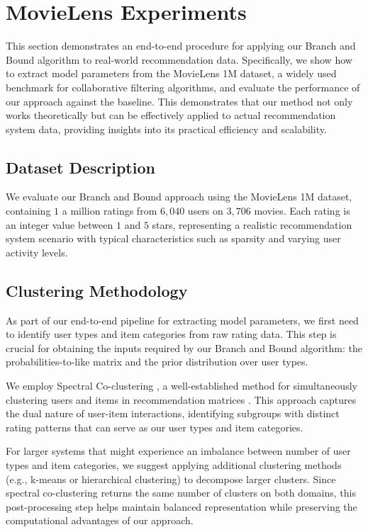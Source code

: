 \section{MovieLens Experiments}\label{sec:movielens}

This section demonstrates an end-to-end procedure for applying our Branch and Bound algorithm to real-world recommendation data. Specifically, we show how to extract model parameters from the MovieLens 1M dataset, a widely used benchmark for collaborative filtering algorithms, and evaluate the performance of our approach against the baseline. This demonstrates that our method not only works theoretically but can be effectively applied to actual recommendation system data, providing insights into its practical efficiency and scalability.

\subsection{Dataset Description}
We evaluate our Branch and Bound approach using the MovieLens 1M dataset, containing $1$ a million ratings from $6,040$ users on $3,706$ movies. Each rating is an integer value between $1$ and $5$ stars, representing a realistic recommendation system scenario with typical characteristics such as sparsity and varying user activity levels.

\subsection{Clustering Methodology}

As part of our end-to-end pipeline for extracting model parameters, we first need to identify user types and item categories from raw rating data. This step is crucial for obtaining the inputs required by our Branch and Bound algorithm: the probabilities-to-like matrix and the prior distribution over user types.

We employ Spectral Co-clustering \citep{coclustering}, a well-established method for simultaneously clustering users and items in recommendation matrices \citep{george2005scalable}. This approach captures the dual nature of user-item interactions, identifying subgroups with distinct rating patterns that can serve as our user types and item categories.

For larger systems that might experience an imbalance between number of user types and item categories, we suggest applying additional clustering methods (e.g., k-means or hierarchical clustering) to decompose larger clusters. Since spectral co-clustering returns the same number of clusters on both domains, this post-processing step helps maintain balanced representation while preserving the computational advantages of our approach.

